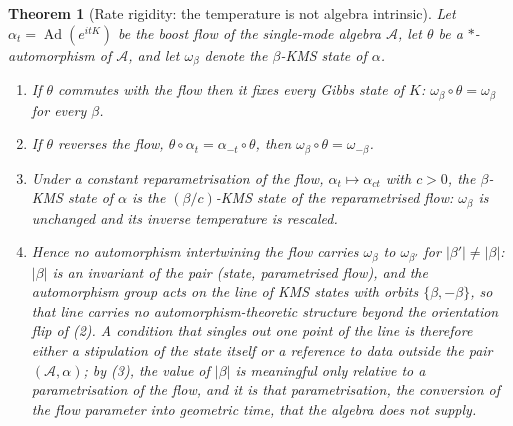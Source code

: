 \documentclass[11pt]{article}
\newtheorem{theorem}{Theorem}[section]
\theoremstyle{definition}
\theoremstyle{plain}
\providecommand{\Aa}{}\renewcommand{\Aa}{\mathcal{A}}
\begin{document}
\begin{theorem}[Rate rigidity: the temperature is not algebra intrinsic]\label{c:singularity.rate-rigidity-temperature-not-algebra-intrinsic}
Let $\alpha_t = \operatorname{Ad}(e^{itK})$ be the boost flow of the single-mode algebra $\Aa$, let $\theta$ be a $*$-automorphism of $\Aa$, and let $\omega_\beta$ denote the $\beta$-KMS state of $\alpha$.
\begin{enumerate}
\item If $\theta$ commutes with the flow then it fixes every Gibbs state of $K$: $\omega_\beta \circ \theta = \omega_\beta$ for every $\beta$.
\item If $\theta$ reverses the flow, $\theta\circ\alpha_t = \alpha_{-t}\circ\theta$, then $\omega_\beta\circ\theta = \omega_{-\beta}$.
\item Under a constant reparametrisation of the flow, $\alpha_t \mapsto \alpha_{ct}$ with $c > 0$, the $\beta$-KMS state of $\alpha$ is the $(\beta/c)$-KMS state of the reparametrised flow: $\omega_\beta$ is unchanged and its inverse temperature is rescaled.
\item Hence no automorphism intertwining the flow carries $\omega_\beta$ to $\omega_{\beta'}$ for $|\beta'| \neq |\beta|$: $|\beta|$ is an invariant of the pair (state, parametrised flow), and the automorphism group acts on the line of KMS states with orbits $\{\beta, -\beta\}$, so that line carries no automorphism-theoretic structure beyond the orientation flip of (2). A condition that singles out one point of the line is therefore either a stipulation of the state itself or a reference to data outside the pair $(\Aa, \alpha)$; by (3), the value of $|\beta|$ is meaningful only relative to a parametrisation of the flow, and it is that parametrisation, the conversion of the flow parameter into geometric time, that the algebra does not supply.
\end{enumerate}
\end{theorem}
\end{document}
